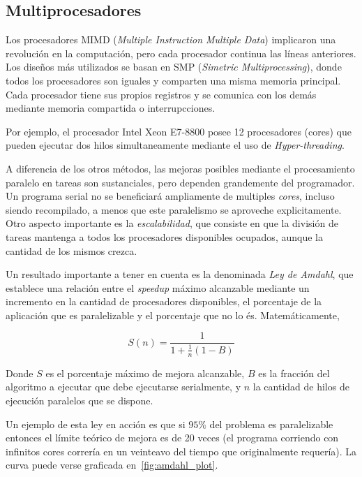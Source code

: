 \subsection{Multiprocesadores}

Los procesadores MIMD (\textit{Multiple Instruction Multiple Data}) implicaron una revoluci\'on en la computaci\'on, pero
cada procesador continua las l\'ineas anteriores.  Los dise\~nos m\'as utilizados se basan en SMP (\textit{Simetric
Multiprocessing}), donde todos los procesadores son iguales y comparten una misma memoria principal. Cada procesador tiene
sus propios registros y se comunica con los dem\'as mediante memoria compartida o interrupcciones.

Por ejemplo, el procesador Intel Xeon E7-8800 posee 12 procesadores (cores) que pueden ejecutar dos hilos simultaneamente
mediante el uso de \textit{Hyper-threading}. 

A diferencia de los otros m\'etodos, las mejoras posibles mediante el procesamiento paralelo en tareas son sustanciales,
pero dependen grandemente del programador. Un programa serial no se beneficiar\'a ampliamente de multiples \textit{cores},
incluso siendo recompilado, a menos que este paralelismo se aproveche explicitamente. Otro aspecto importante es la
\textit{escalabilidad}, que consiste en que la divisi\'on de tareas mantenga a todos los procesadores disponibles ocupados,
aunque la cantidad de los mismos crezca.

Un resultado importante a tener en cuenta es la denominada \textit{Ley de Amdahl}, que establece una relaci\'on entre
el \textit{speedup} m\'aximo alcanzable mediante un incremento en la cantidad de procesadores disponibles, el porcentaje
de la aplicaci\'on que es paralelizable y el porcentaje que no lo \'es. Matem\'aticamente,

\begin{equation}
    \label{eq:amdahl}
    S(n) = \frac{1}{1 + \frac{1}{n} (1 - B)}
\end{equation}

Donde $S$ es el porcentaje m\'aximo de mejora alcanzable, $B$ es la fracci\'on del algoritmo a ejecutar que debe ejecutarse
serialmente, y $n$ la cantidad de hilos de ejecuci\'on paralelos que se dispone.

Un ejemplo de esta ley en acci\'on es que si $95 \%$ del problema es paralelizable entonces el l\'imite te\'orico de
mejora es de 20 veces (el programa corriendo con infinitos cores correr\'ia en un veinteavo del tiempo que originalmente
requer\'ia). La curva puede verse graficada en~\ref{fig:amdahl_plot}.

